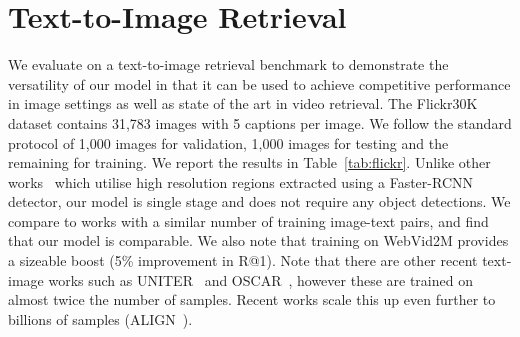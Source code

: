 \documentclass[10pt,twocolumn,letterpaper]{article}
\begin{document}
{
\hypersetup{linkcolor=black}
\parttoc 
}

\bigskip

\section{Text-to-Image Retrieval}

We evaluate on a text-to-image retrieval benchmark to demonstrate the versatility of our model in that it can be used to achieve competitive performance in image settings as well as state of the art in video retrieval. The Flickr30K~\cite{young-etal-2014-image} dataset contains 31,783 images with 5 captions per image. We follow the standard protocol of 1,000 images for validation, 1,000 images for testing and the remaining for training.
We report the results in Table~\ref{tab:flickr}.
Unlike other works~\cite{lee2018stacked,chen2020imram,diao2021similarity} which utilise high resolution regions extracted using a Faster-RCNN detector, our model is single stage and does not require any object detections. We compare to works with a similar number of training image-text pairs, and find that our model is comparable. We also note that training on WebVid2M provides a sizeable boost (5\% improvement in R@1). Note that there are other recent text-image works such as UNITER~\cite{chen2020uniter} and OSCAR~\cite{li2020oscar}, however these are trained on almost twice the number of samples. Recent works scale this up even further to billions of samples (ALIGN~\cite{jia2021scaling}). 
\end{document}
